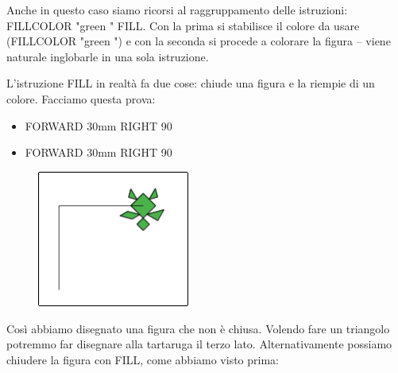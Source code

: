 \vskip 1cm

Anche in questo caso siamo ricorsi al raggruppamento delle istruzioni:
FILLCOLOR  "green " FILL. Con la prima si stabilisce il colore da usare
(FILLCOLOR  "green ") e con la seconda si procede a colorare la figura – viene
naturale inglobarle in una sola istruzione. 

L'istruzione FILL in realtà fa due cose: chiude una figura e la riempie di un
colore. Facciamo questa prova: 

\vskip 1cm

\begin{scriptsize}
\begin{minipage}{0.40\textwidth}
\begin{itemize}[itemsep=-3pt,parsep=2pt]
\item[] FORWARD 30mm RIGHT 90
\item[] FORWARD 30mm RIGHT 90
\end{itemize}
\end{minipage}
\end{scriptsize}
\begin{minipage}{0.4\textwidth}
\begin{figure}[H]
   \includegraphics[width=5.0cm,trim=4 4 8 4,clip]{./images/disegnare/disegnare-12.png}
   \label{dis-12}
\end{figure}
\end{minipage} \hfill

\vskip 1cm

Così abbiamo disegnato una figura che non è chiusa. Volendo fare un triangolo potremmo far disegnare alla tartaruga il terzo lato. Alternativamente possiamo chiudere la figura con FILL, come abbiamo visto prima:

\vskip 1cm

